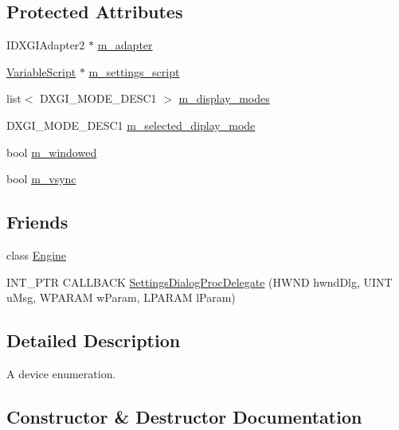 \subsection*{Protected Attributes}
\begin{DoxyCompactItemize}
\item 
I\+D\+X\+G\+I\+Adapter2 $\ast$ \hyperlink{classmage_1_1_device_enumeration_a03dfd87e73148c16dd6e6a85b4f8d8ed}{m\+\_\+adapter}
\item 
\hyperlink{classmage_1_1_variable_script}{Variable\+Script} $\ast$ \hyperlink{classmage_1_1_device_enumeration_a37fe23eef4ec5631831eb163a96d60f1}{m\+\_\+settings\+\_\+script}
\item 
list$<$ D\+X\+G\+I\+\_\+\+M\+O\+D\+E\+\_\+\+D\+E\+S\+C1 $>$ \hyperlink{classmage_1_1_device_enumeration_aae356ac476a35ce4074f61cfd75ecdbe}{m\+\_\+display\+\_\+modes}
\item 
D\+X\+G\+I\+\_\+\+M\+O\+D\+E\+\_\+\+D\+E\+S\+C1 \hyperlink{classmage_1_1_device_enumeration_aadeabdccd5f14eb037de31a2a05a4d82}{m\+\_\+selected\+\_\+diplay\+\_\+mode}
\item 
bool \hyperlink{classmage_1_1_device_enumeration_a277c5dae7861c9cb1175192a61274cc9}{m\+\_\+windowed}
\item 
bool \hyperlink{classmage_1_1_device_enumeration_a027220f50649c40785e2b918411adfad}{m\+\_\+vsync}
\end{DoxyCompactItemize}
\subsection*{Friends}
\begin{DoxyCompactItemize}
\item 
class \hyperlink{classmage_1_1_device_enumeration_a3e1914489e4bed4f9f23cdeab34a43dc}{Engine}
\item 
I\+N\+T\+\_\+\+P\+TR C\+A\+L\+L\+B\+A\+CK \hyperlink{classmage_1_1_device_enumeration_a3dff4eb8907e2e10f26cc616fe1c104d}{Settings\+Dialog\+Proc\+Delegate} (H\+W\+ND hwnd\+Dlg, U\+I\+NT u\+Msg, W\+P\+A\+R\+AM w\+Param, L\+P\+A\+R\+AM l\+Param)
\end{DoxyCompactItemize}


\subsection{Detailed Description}
A device enumeration. 

\subsection{Constructor \& Destructor Documentation}
\hypertarget{classmage_1_1_device_enumeration_aa000048648beb6c2aca70e5ef04e0da2}{}\label{classmage_1_1_device_enumeration_aa000048648beb6c2aca70e5ef04e0da2} 
